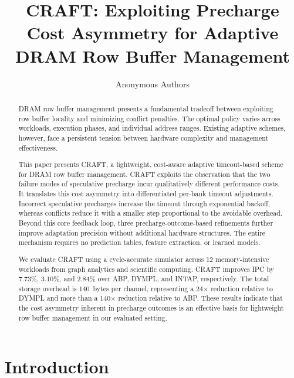 \documentclass[runningheads]{llncs}
\begin{document}
%
\title{CRAFT: Exploiting Precharge Cost Asymmetry for Adaptive DRAM Row Buffer Management}
%
%
\author{Anonymous Authors}
%
%
\institute{}
%
\maketitle              %
%
\begin{abstract}
DRAM row buffer management presents a fundamental tradeoff between exploiting row buffer locality and minimizing conflict penalties. The optimal policy varies across workloads, execution phases, and individual address ranges. Existing adaptive schemes, however, face a persistent tension between hardware complexity and management effectiveness.

This paper presents CRAFT, a lightweight, cost-aware adaptive timeout-based scheme for DRAM row buffer management. CRAFT exploits the observation that the two failure modes of speculative precharge incur qualitatively different performance costs. It translates this cost asymmetry into differentiated per-bank timeout adjustments. Incorrect speculative precharges increase the timeout through exponential backoff, whereas conflicts reduce it with a smaller step proportional to the avoidable overhead. Beyond this core feedback loop, three precharge-outcome-based refinements further improve adaptation precision without additional hardware structures. The entire mechanism requires no prediction tables, feature extraction, or learned models.

We evaluate CRAFT using a cycle-accurate simulator across 12 memory-intensive workloads from graph analytics and scientific computing. CRAFT improves IPC by 7.73\%, 3.10\%, and 2.84\% over ABP, DYMPL, and INTAP, respectively. The total storage overhead is 140~bytes per channel, representing a 24$\times$ reduction relative to DYMPL and more than a 140$\times$ reduction relative to ABP. These results indicate that the cost asymmetry inherent in precharge outcomes is an effective basis for lightweight row buffer management in our evaluated setting.

\end{abstract}
%
%
%
\section{Introduction}
\end{document}
